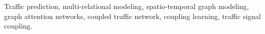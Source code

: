 \documentclass[journal]{IEEEtran}
\begin{document}
{\begin{abstract}
    \end{abstract}
    \begin{IEEEkeywords}
        Traffic prediction, multi-relational modeling, spatio-temporal graph modeling, graph attention networks, coupled traffic network, coupling learning, traffic signal coupling.
    \end{IEEEkeywords}
}

\maketitle
\end{document}
